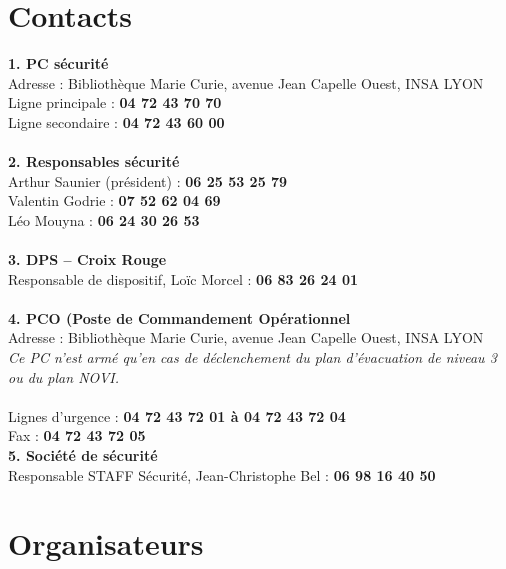 \documentclass[hidelinks, paper=a4, fontsize=13pt]{report}
\begin{document}
\section{Contacts}
\label{refTelPC}

\textbf{1. PC sécurité}\\
Adresse : Bibliothèque Marie Curie, avenue Jean Capelle Ouest, INSA LYON\\
Ligne principale : \textbf{04 72 43 70 70}\\
Ligne secondaire : \textbf{04 72 43 60 00}\\\\

\textbf{2. Responsables sécurité}\\
Arthur Saunier (président) : \textbf{06 25 53 25 79}\\
Valentin Godrie : \textbf{07 52 62 04 69}\\
Léo Mouyna : \textbf{06 24 30 26 53}\\
\\

\textbf{3. DPS – Croix Rouge}\\
Responsable de dispositif, Loïc Morcel : \textbf{06 83 26 24 01}\\\\

\textbf{4. PCO (Poste de Commandement Opérationnel}\\
Adresse : Bibliothèque Marie Curie, avenue Jean Capelle Ouest, INSA LYON\\
\textit{Ce PC n’est armé qu'en cas de déclenchement du plan d'évacuation de niveau 3 ou du plan NOVI.\\\\
}Lignes d’urgence : 			\textbf{04 72 43 72 01   à 	04 72 43 72 04}\\
Fax : 					\textbf{04 72 43 72 05}\\

\textbf{5. Société de sécurité}\\
Responsable STAFF Sécurité, Jean-Christophe Bel : \textbf{06 98 16 40 50}\\
 
\newpage

\section{Organisateurs}
\label{refTelOrgas}

\tabletail{\hline}
\end{document}
